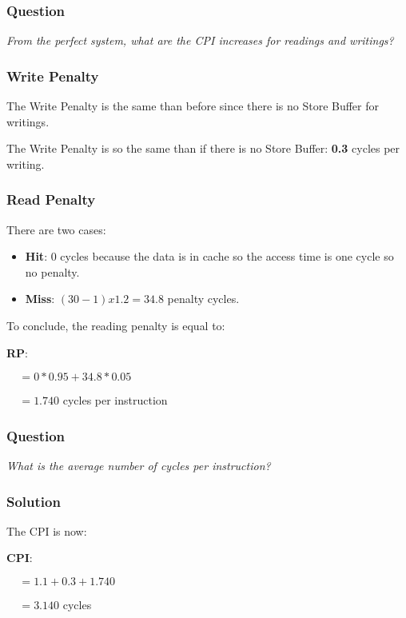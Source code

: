 
\begin{frame}
  \frametitle{Question}

  \textit{From the perfect system, what are the CPI increases for
    readings and writings?}
\end{frame}


\begin{frame}
  \frametitle{Write Penalty}

  The Write Penalty is the same than before since there is no Store
  Buffer for writings.

  \-

  The Write Penalty is so the same than if there is no Store Buffer:
  \textbf{0.3} cycles per writing.
\end{frame}


\begin{frame}[containsverbatim]
  \frametitle{Read Penalty}

  There are two cases:

  \begin{itemize}
    \item
      \textbf{Hit}: 0 cycles because the data is in cache so the access time
      is one cycle so no penalty.
    \item
      \textbf{Miss}: $(30 - 1) x 1.2 = 34.8$ penalty cycles.
  \end{itemize}

  To conclude, the reading penalty is equal to:

  \-

  \textbf{RP}:

  $~~~~~= 0 * 0.95 + 34.8 * 0.05$

  $~~~~~= 1.740$ cycles per instruction
\end{frame}


\begin{frame}
  \frametitle{Question}

  \textit{What is the average number of cycles per instruction?}
\end{frame}


\begin{frame}
  \frametitle{Solution}

  The CPI is now:

  \-

  \textbf{CPI}:

  $~~~~~= 1.1 + 0.3 + 1.740$

  $~~~~~= 3.140$ cycles
\end{frame}

